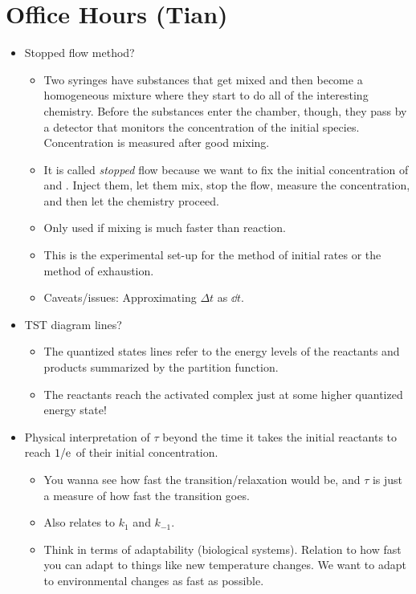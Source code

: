 \documentclass[../notes.tex]{subfiles}
\begin{document}
\section{Office Hours (Tian)}
\begin{itemize}
    \item Stopped flow method?
    \begin{itemize}
        \item Two syringes have substances that get mixed and then become a homogeneous mixture where they start to do all of the interesting chemistry. Before the substances enter the chamber, though, they pass by a detector that monitors the concentration of the initial species. Concentration is measured after good mixing.
        \item It is called \emph{stopped} flow because we want to fix the initial concentration of  and . Inject them, let them mix, stop the flow, measure the concentration, and then let the chemistry proceed.
        \item Only used if mixing is much faster than reaction.
        \item This is the experimental set-up for the method of initial rates or the method of exhaustion.
        \item Caveats/issues: Approximating $\Delta t$ as $\dd{t}$.
    \end{itemize}
    \item TST diagram lines?
    \begin{itemize}
        \item The quantized states lines refer to the energy levels of the reactants and products summarized by the partition function.
        \item The reactants reach the activated complex just at some higher quantized energy state!
    \end{itemize}
    \item Physical interpretation of $\tau$ beyond the time it takes the initial reactants to reach $1/\text{e}^{}$ of their initial concentration.
    \begin{itemize}
        \item You wanna see how fast the transition/relaxation would be, and $\tau$ is just a measure of how fast the transition goes.
        \item Also relates to $k_1$ and $k_{-1}$.
        \item Think in terms of adaptability (biological systems). Relation to how fast you can adapt to things like new temperature changes. We want to adapt to environmental changes as fast as possible.

\end{itemize}
\end{itemize}
\end{document}
